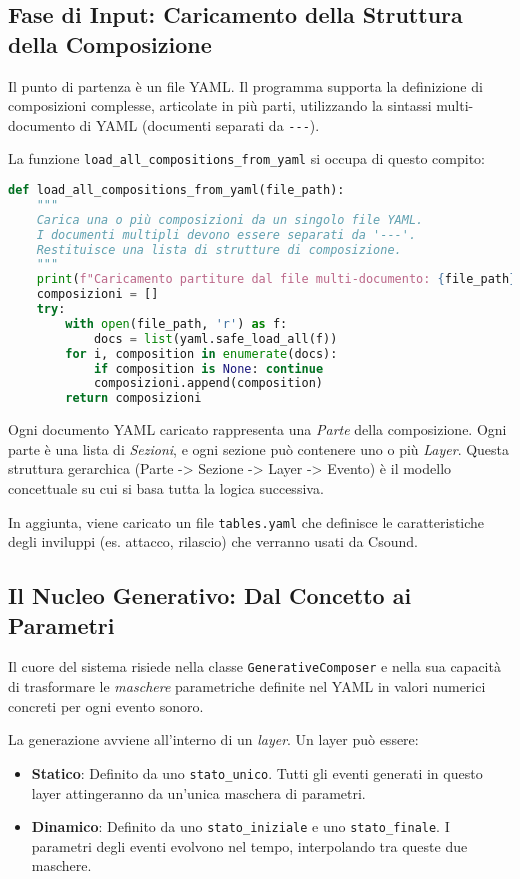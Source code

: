 \subsection{Fase di Input: Caricamento della Struttura della Composizione}
Il punto di partenza è un file YAML. Il programma supporta la definizione di composizioni complesse, articolate in più parti, utilizzando la sintassi multi-documento di YAML (documenti separati da \texttt{{-}{-}{-}}).

La funzione \texttt{load\_all\_compositions\_from\_yaml} si occupa di questo compito:

\begin{lstlisting}[language=Python]
def load_all_compositions_from_yaml(file_path):
    """
    Carica una o più composizioni da un singolo file YAML.
    I documenti multipli devono essere separati da '---'.
    Restituisce una lista di strutture di composizione.
    """
    print(f"Caricamento partiture dal file multi-documento: {file_path}")
    composizioni = []
    try:
        with open(file_path, 'r') as f:
            docs = list(yaml.safe_load_all(f))
        for i, composition in enumerate(docs):
            if composition is None: continue 
            composizioni.append(composition)
        return composizioni
\end{lstlisting}

Ogni documento YAML caricato rappresenta una \textit{Parte} della composizione. Ogni parte è una lista di \textit{Sezioni}, e ogni sezione può contenere uno o più \textit{Layer}. Questa struttura gerarchica (Parte -> Sezione -> Layer -> Evento) è il modello concettuale su cui si basa tutta la logica successiva.

In aggiunta, viene caricato un file \texttt{tables.yaml} che definisce le caratteristiche degli inviluppi (es. attacco, rilascio) che verranno usati da Csound.
\subsection{Il Nucleo Generativo: Dal Concetto ai Parametri}
Il cuore del sistema risiede nella classe \texttt{GenerativeComposer} e nella sua capacità di trasformare le \textit{maschere} parametriche definite nel YAML in valori numerici concreti per ogni evento sonoro.

La generazione avviene all'interno di un \textit{layer}. Un layer può essere:
\begin{itemize}
 \item \textbf{Statico}: Definito da uno \texttt{stato\_unico}. Tutti gli eventi generati in questo layer attingeranno da un'unica maschera di parametri.
 \item \textbf{Dinamico}: Definito da uno \texttt{stato\_iniziale} e uno \texttt{stato\_finale}. I parametri degli eventi evolvono nel tempo, interpolando tra queste due maschere.
\end{itemize}

